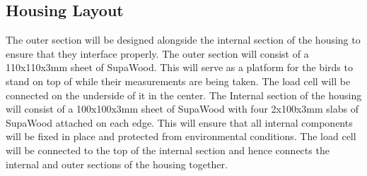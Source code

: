\documentclass[class=report,11pt,crop=false]{standalone}
\begin{document}
\subsection{Housing Layout}
The outer section will be designed alongside the internal section of the housing to ensure that they interface properly. The outer section will consist of a 110x110x3mm sheet of SupaWood. This will serve as a platform for the birds to stand on top of while their measurements are being taken. The load cell will be connected on the underside of it in the center. The Internal section of the housing will consist of a 100x100x3mm sheet of SupaWood with four 2x100x3mm slabs of SupaWood attached on each edge. This will ensure that all internal components will be fixed in place and protected from environmental conditions. The load cell will be connected to the top of the internal section and hence connects the internal and outer sections of the housing together. 

	\ifstandalone
	
	\printnoidxglossary[type=\acronymtype,nonumberlist]
	\fi
	
\end{document}
